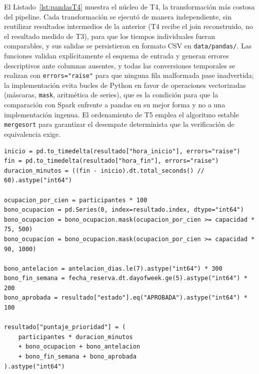 \documentclass[10pt,journal]{IEEEtran}
\begin{document}
El Listado~\ref{lst:pandasT4} muestra el n\'ucleo de T4, la transformaci\'on
m\'as costosa del pipeline. Cada transformaci\'on se ejecut\'o de manera
independiente, sin reutilizar resultados intermedios de la anterior (T4 recibe
el join reconstruido, no el resultado medido de T3), para que los tiempos
individuales fueran comparables, y sus salidas se persistieron en formato CSV en
\texttt{data/pandas/}. Las funciones validan expl\'icitamente el esquema de
entrada y generan errores descriptivos ante columnas ausentes, y todas las
conversiones temporales se realizan con \verb|errors="raise"| para que
ninguna fila malformada pase inadvertida; la implementaci\'on evita bucles de
Python en favor de operaciones vectorizadas (m\'ascaras, \texttt{mask},
aritm\'etica de series), que es la condici\'on para que la comparaci\'on con
Spark enfrente a pandas en su mejor forma y no a una implementaci\'on ingenua.
El ordenamiento de T5 emplea el algoritmo estable \texttt{mergesort} para
garantizar el desempate determinista que la verificaci\'on de equivalencia
exige.

\begin{lstlisting}[caption={N\'ucleo de la columna derivada T4 en pandas (extracto de \texttt{src/transformaciones\_pandas.py}).},label={lst:pandasT4}]
inicio = pd.to_timedelta(resultado["hora_inicio"], errors="raise")
fin = pd.to_timedelta(resultado["hora_fin"], errors="raise")
duracion_minutos = ((fin - inicio).dt.total_seconds() // 60).astype("int64")

ocupacion_por_cien = participantes * 100
bono_ocupacion = pd.Series(0, index=resultado.index, dtype="int64")
bono_ocupacion = bono_ocupacion.mask(ocupacion_por_cien >= capacidad * 75, 500)
bono_ocupacion = bono_ocupacion.mask(ocupacion_por_cien >= capacidad * 90, 1000)

bono_antelacion = antelacion_dias.le(7).astype("int64") * 300
bono_fin_semana = fecha_reserva.dt.dayofweek.ge(5).astype("int64") * 200
bono_aprobada = resultado["estado"].eq("APROBADA").astype("int64") * 100

resultado["puntaje_prioridad"] = (
    participantes * duracion_minutos
    + bono_ocupacion + bono_antelacion
    + bono_fin_semana + bono_aprobada
).astype("int64")
\end{lstlisting}
\end{document}
